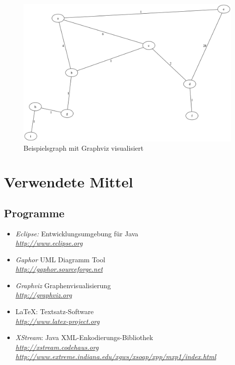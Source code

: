 \documentclass[a4paper,titlepage]{article}
\begin{document}
\begin{figure}[h!]
\begin{center}
\includegraphics[width=\textwidth]{screenshot/example_dot.png}
\end{center}
\caption{Beispielsgraph mit Graphviz visualisiert}
\end{figure}

\newpage

\section{Verwendete Mittel}

\subsection{Programme}

\begin{itemize}
\item \emph{Eclipse:} Entwicklungsumgebung für Java \\
	\emph{\href{http://www.eclipse.org}{http://www.eclipse.org}}
\item \emph{Gaphor} UML Diagramm Tool \\
	\emph{\href{http://gaphor.sourceforge.net}{http://gaphor.sourceforge.net}}
\item \emph{Graphviz} Graphenvisualisierung \\
	\emph{\href{http://graphviz.org}{http://graphviz.org}}
\item \LaTeX: Textsatz-Software \\
	\emph{\href{http://www.latex-project.org}{http://www.latex-project.org}}
\item \emph{XStream}: Java XML-Enkodierungs-Bibliothek \\
	\emph{\href{http://xstream.codehaus.org}{http://xstream.codehaus.org}} \\
	\emph{\href{http://www.extreme.indiana.edu/xgws/xsoap/xpp/mxp1/index.html}{http://www.extreme.indiana.edu/xgws/xsoap/xpp/mxp1/index.html}}
\end{itemize}
\end{document}

